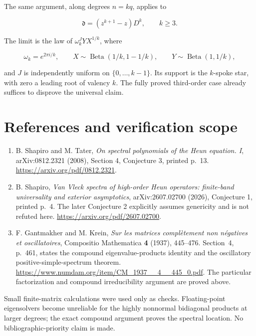 \documentclass[11pt,a4paper]{article}
\providecommand{\tightlist}{\setlength{\itemsep}{0pt}\setlength{\parskip}{0pt}}
\begin{document}
The same argument, along degrees \(n=kq\), applies to

\[
\mathfrak d=(z^{k+1}-z)D^k,\qquad k\geq3.
\]

The limit is the law of \(\omega_k^JYX^{1/k}\), where

\[
\omega_k=e^{2\pi i/k},\qquad
X\sim\operatorname{Beta}(1/k,1-1/k),\qquad
Y\sim\operatorname{Beta}(1,1/k),
\]

and \(J\) is independently uniform on \(\{0,\ldots,k-1\}\). Its support
is the \(k\)-spoke star, with zero a leading root of valency \(k\). The
fully proved third-order case already suffices to disprove the universal
claim.

\hypertarget{1032-references-and-verification-scope}{%
\section{References and verification
scope}\label{1032-references-and-verification-scope}}

\begin{enumerate}
\def\labelenumi{\arabic{enumi}.}
\tightlist
\item
  B. Shapiro and M. Tater, \emph{On spectral polynomials of the Heun
  equation. I}, arXiv:0812.2321 (2008), Section 4, Conjecture 3, printed
  p.~13. \url{https://arxiv.org/pdf/0812.2321}.
\item
  B. Shapiro, \emph{Van Vleck spectra of high-order Heun operators:
  finite-band universality and exterior asymptotics}, arXiv:2607.02700
  (2026), Conjecture 1, printed p.~4. The later Conjecture 2 explicitly
  assumes genericity and is not refuted here.
  \url{https://arxiv.org/pdf/2607.02700}.
\item
  F. Gantmakher and M. Krein,
  \emph{Sur les matrices complètement non négatives et oscillatoires},
  Compositio Mathematica \textbf{4} (1937), 445--476.
  Section~4, p.~461, states the compound eigenvalue-products identity
  and the oscillatory positive-simple-spectrum theorem.
  \url{https://www.numdam.org/item/CM_1937__4__445_0.pdf}.
  The particular factorization and compound irreducibility argument are
  proved above.
\end{enumerate}

Small finite-matrix calculations were used only as checks.
Floating-point eigensolvers become unreliable for the highly nonnormal
bidiagonal products at larger degrees; the exact compound argument
proves the spectral location. No bibliographic-priority claim is made.
\end{document}
